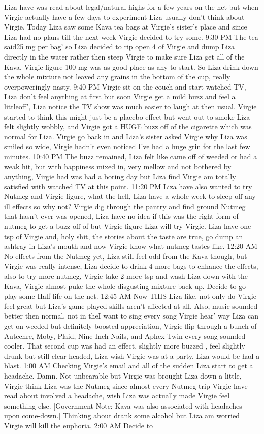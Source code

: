 \documentclass[12pt]{book}
\begin{document}
Liza have was read about legal/natural highs for a few years on the net but when Virgie actually have a few days to experiment Liza usually don't think about Virgie. Today Liza saw some Kava tea bags at Virgie's sister's place and since Liza had no plans till the next week Virgie decided to try some. 9:30 PM The tea said25 mg per bag' so Liza decided to rip open 4 of Virgie and dump Liza directly in the water rather then steep Virgie to make sure Liza get all of the Kava, Virgie figure 100 mg was as good place as any to start. So Liza drink down the whole mixture not leaved any grains in the bottom of the cup, really overpoweringly nasty. 9:40 PM Virgie sit on the couch and start watched TV, Liza don't feel anything at first but soon Virgie get a mild buzz and feel a littleoff', Liza notice the TV show was much easier to laugh at then usual. Virgie started to think this might just be a placebo effect but went out to smoke Liza felt slightly wobbly, and Virgie got a HUGE buzz off of the cigarette which was normal for Liza. Virgie go back in and Liza's sister asked Virgie why Liza was smiled so wide, Virgie hadn't even noticed I've had a huge grin for the last few minutes. 10:40 PM The buzz remained, Liza felt like came off of weeded or had a weak hit, but with happiness mixed in, very mellow and not bothered by anything, Virgie had was had a boring day but Liza find Virgie am totally satisfied with watched TV at this point. 11:20 PM Liza have also wanted to try Nutmeg and Virgie figure, what the hell, Liza have a whole week to sleep off any ill effects so why not? Virgie dig through the pantry and find ground Nutmeg that hasn't ever was opened, Liza have no idea if this was the right form of nutmeg to get a buzz off of but Virgie figure Liza will try Virgie. Liza have one tsp of Virgie and, holy shit, the stories about the taste are true, go dump an ashtray in Liza's mouth and now Virgie know what nutmeg tastes like. 12:20 AM No effects from the Nutmeg yet, Liza still feel odd from the Kava though, but Virgie was really intense, Liza decide to drink 4 more bags to enhance the effects, also to try more nutmeg, Virgie take 2 more tsp and wash Liza down with the Kava, Virgie almost puke the whole disgusting mixture back up. Decide to go play some Half-life on the net. 12:45 AM Now THIS Liza like, not only do Virgie feel great but Liza's game played skills aren't affected at all. Also, music sounded better then normal, not in theI want to sing every song Virgie hear' way Liza can get on weeded but definitely boosted appreciation, Virgie flip through a bunch of Autechre, Moby, Plaid, Nine Inch Nails, and Aphex Twin every song sounded cooler. That second cup was had an effect, slightly more buzzed , feel slightly drunk but still clear headed, Liza wish Virgie was at a party, Liza would be had a blast. 1:00 AM Checking Virgie's email and all of the sudden Liza start to get a headache. Damn. Not unbearable but Virgie was brought Liza down a little, Virgie think Liza was the Nutmeg since almost every Nutmeg trip Virgie have read about involved a headache, wish Liza was actually made Virgie feel something else. [Government Note: Kava was also associated with headaches upon come-down.] Thinking about drank some alcohol but Liza am worried Virgie will kill the euphoria. 2:00 AM Decide to 
\end{document}
